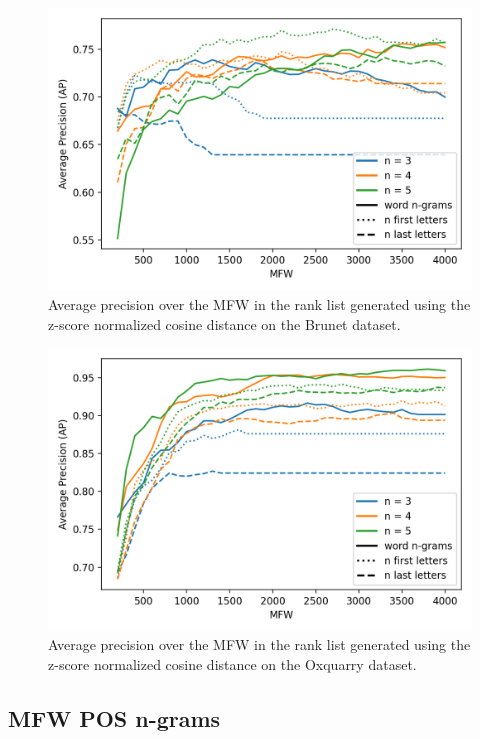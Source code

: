 \begin{figure}
  \includegraphics[width=\linewidth]{img/first_last_letters_ngrams_brunet.png}
  \caption{Average precision over the MFW in the rank list generated using the z-score normalized cosine distance on the Brunet dataset.}
  \label{fig:first_last_letters_ngrams_brunet}
\end{figure}
\begin{figure}
  \includegraphics[width=\linewidth]{img/first_last_letters_ngrams_oxquarry.png}
  \caption{Average precision over the MFW in the rank list generated using the z-score normalized cosine distance on the Oxquarry dataset.}
  \label{fig:first_last_letters_ngrams_oxquarry}
\end{figure}

\subsection{MFW POS n-grams}


